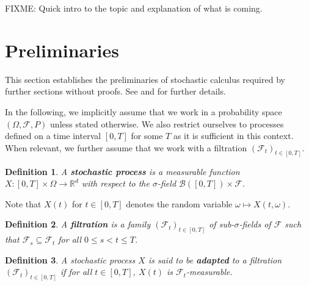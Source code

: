 \documentclass[a4paper]{article}
\newtheorem{definition}{Definition}
\begin{document}
FIXME: Quick intro to the topic and explanation of what is coming.

\section{Preliminaries}


This section establishes the preliminaries of stochastic calculus required by further sections without proofs. See \textcite{capinski_stochastic_2012} and \textcite{capinski_blackscholes_2012} for further details.

In the following, we implicitly assume that we work in a probability space $(\Omega, \mathcal{F}, P)$ unless stated otherwise. We also restrict ourselves to processes defined on a time interval $[0,T]$ for some $T$ as it is sufficient in this context. When relevant, we further assume that we work with a filtration $(\mathcal{F}_t)_{t \in [0,T]}$.

\begin{definition}
  A \textbf{stochastic process} is a measurable function $X : [0,T] \times \Omega \to \mathbb{R}^d$ with respect to the $\sigma$-field $\mathcal{B}([0,T]) \times \mathcal{F}$.
\end{definition}

Note that $X(t)$ for $t \in [0,T]$ denotes the random variable $\omega \mapsto X(t,\omega)$.

\begin{definition}
  A \textbf{filtration} is a family $(\mathcal{F}_t)_{t \in [0,T]}$ of sub-$\sigma$-fields of $\mathcal{F}$ such that $\mathcal{F}_s \subseteq \mathcal{F}_t$ for all $0 \le s < t \le T$.
\end{definition}

\begin{definition}
  A stochastic process $X$ is said to be \textbf{adapted} to a filtration $(\mathcal{F}_t)_{t \in [0,T]}$ if for all $t \in [0,T]$, $X(t)$ is $\mathcal{F}_t$-measurable.
\end{definition}
\end{document}
